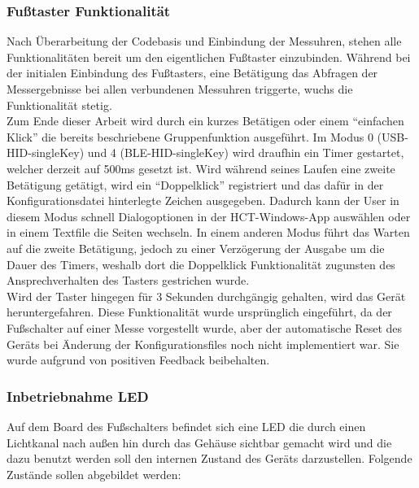 \subsubsection{Fußtaster Funktionalität}
Nach Überarbeitung der Codebasis und Einbindung der Messuhren, stehen alle Funktionalitäten bereit um den eigentlichen Fußtaster einzubinden. Während bei der initialen Einbindung des Fußtasters, eine Betätigung das Abfragen der Messergebnisse bei allen verbundenen Messuhren triggerte, wuchs die Funktionalität stetig.\\
Zum Ende dieser Arbeit wird durch ein kurzes Betätigen oder einem ``einfachen Klick'' die bereits beschriebene Gruppenfunktion ausgeführt. Im Modus 0 (USB-\ac{HID}-singleKey) und 4 (\ac{BLE}-\ac{HID}-singleKey) wird draufhin ein Timer gestartet, welcher derzeit auf 500ms gesetzt ist. Wird während seines Laufen eine zweite Betätigung getätigt, wird ein ``Doppelklick'' registriert und das dafür in der Konfigurationsdatei hinterlegte Zeichen ausgegeben. Dadurch kann der User in diesem Modus schnell Dialogoptionen in der \ac{HCT}-Windows-App auswählen oder in einem Textfile die Seiten wechseln. In einem anderen Modus führt das Warten auf die zweite Betätigung, jedoch zu einer Verzögerung der Ausgabe um die Dauer des Timers, weshalb dort die Doppelklick Funktionalität zugunsten des Ansprechverhalten des Tasters gestrichen wurde.\\
Wird der Taster hingegen für 3 Sekunden durchgängig gehalten, wird das Gerät heruntergefahren. Diese Funktionalität wurde ursprünglich eingeführt, da der Fußschalter auf einer Messe vorgestellt wurde, aber der automatische Reset des Geräts bei Änderung der Konfigurationsfiles noch nicht implementiert war. Sie wurde aufgrund von positiven Feedback beibehalten.

\subsubsection{Inbetriebnahme LED}
Auf dem Board des Fußschalters befindet sich eine \ac{LED} die durch einen Lichtkanal nach außen hin durch das Gehäuse sichtbar gemacht wird und die dazu benutzt werden soll den internen Zustand des Geräts darzustellen. Folgende Zustände sollen abgebildet werden: 

